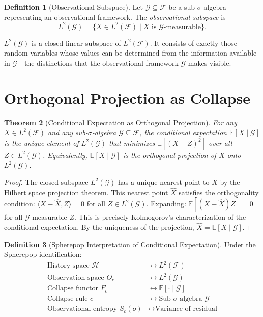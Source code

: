 \documentclass[12pt, a4paper, openany]{book}
\theoremstyle{plain}
\newtheorem{theorem}{Theorem}[chapter]
\theoremstyle{definition}
\newtheorem{definition}[theorem]{Definition}
\theoremstyle{remark}
\newcommand{\calH}{\mathcal{H}}
\begin{document}
\begin{definition}[Observational Subspace]
Let $\mathcal{G} \subseteq \mathcal{F}$ be a sub-$\sigma$-algebra representing
an observational framework. The \emph{observational subspace} is
\[
L^2(\mathcal{G}) = \{X \in L^2(\mathcal{F}) \mid X \text{ is } \mathcal{G}\text{-measurable}\}.
\]
\end{definition}

$L^2(\mathcal{G})$ is a closed linear subspace of $L^2(\mathcal{F})$. It consists
of exactly those random variables whose values can be determined from the
information available in $\mathcal{G}$---the distinctions that the observational
framework $\mathcal{G}$ makes visible.

\section{Orthogonal Projection as Collapse}

\begin{theorem}[Conditional Expectation as Orthogonal Projection]
For any $X \in L^2(\mathcal{F})$ and any sub-$\sigma$-algebra
$\mathcal{G} \subseteq \mathcal{F}$, the conditional expectation
$\mathbb{E}[X \mid \mathcal{G}]$ is the unique element of $L^2(\mathcal{G})$
that minimizes $\mathbb{E}[(X - Z)^2]$ over all $Z \in L^2(\mathcal{G})$.
Equivalently, $\mathbb{E}[X \mid \mathcal{G}]$ is the orthogonal projection of
$X$ onto $L^2(\mathcal{G})$.
\end{theorem}

\begin{proof}
The closed subspace $L^2(\mathcal{G})$ has a unique nearest point to $X$
by the Hilbert space projection theorem. This nearest point $\hat{X}$ satisfies
the orthogonality condition: $\langle X - \hat{X}, Z \rangle = 0$ for all
$Z \in L^2(\mathcal{G})$. Expanding: $\mathbb{E}[(X - \hat{X})Z] = 0$ for all
$\mathcal{G}$-measurable $Z$. This is precisely Kolmogorov's characterization of
the conditional expectation. By the uniqueness of the projection, $\hat{X} =
\mathbb{E}[X \mid \mathcal{G}]$.
\end{proof}

\begin{definition}[Spherepop Interpretation of Conditional Expectation]
Under the Spherepop identification:
\begin{align*}
\text{History space } \calH &\longleftrightarrow L^2(\mathcal{F}) \\
\text{Observation space } O_c &\longleftrightarrow L^2(\mathcal{G}) \\
\text{Collapse functor } F_c &\longleftrightarrow \mathbb{E}[\cdot \mid \mathcal{G}] \\
\text{Collapse rule } c &\longleftrightarrow \text{Sub-}\sigma\text{-algebra } \mathcal{G} \\
\text{Observational entropy } S_c(o) &\longleftrightarrow \text{Variance of residual}
\end{align*}
\end{definition}
\end{document}
